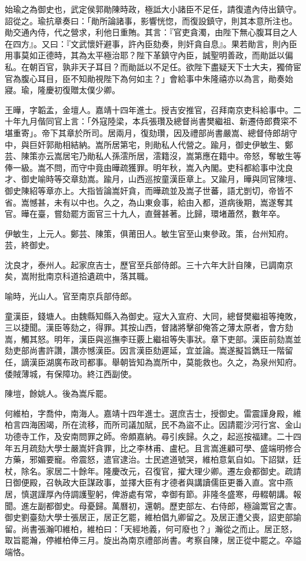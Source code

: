 \begin{pinyinscope}
始瑜之為御史也，武定侯郭勛陳時政，極詆大小諸臣不足任，請復遣內侍出鎮守。詔從之。瑜抗章奏曰：「勛所論諸事，影響恍惚，而復設鎮守，則其本意所注也。勛交通內侍，代之營求，利他日重賄。其言：『官吏貪濁，由陛下無心腹耳目之人在四方』。又曰：『文武懷奸避事，許內臣劾奏，則奸貪自息』。果若勛言，則內臣用事莫如正德時，其為太平極治耶？陛下革鎮守內臣，誠聖明善政，而勛詆以偏私。在朝百官，孰非天子耳目？而勛詆以不足任。欲陛下盡疑天下士大夫，獨倚宦官為腹心耳目，臣不知勛視陛下為何如主？」會給事中朱隆禧亦以為言，勛奏始寢。瑜，隆慶初復贈太僕少卿。

王曄，字韜孟，金壇人。嘉靖十四年進士。授吉安推官，召拜南京吏科給事中。二十年九月偕同官上言：「外寇陸梁，本兵張瓚及總督尚書樊繼祖、新遷侍郎費寀不堪重寄」。帝下其章於所司。居兩月，復劾瓚，因及禮部尚書嚴嵩、總督侍郎胡守中，與巨奸郭勛相結納。嵩所居第宅，則勛私人代營之。踰月，御史伊敏生、鄭芸、陳策亦云嵩居宅乃勛私人孫澐所居，澐籍沒，嵩第應在籍中。帝怒，奪敏生等俸一級。嵩不問，而守中竟由曄疏獲罪。明年秋，嵩入內閣。吏科都給事中沈良才、御史喻時等交章劾嵩。踰月，山西巡按童漢臣章上。又踰月，曄與同官陳塏、御史陳紹等章亦上。大指皆論嵩奸貪，而曄疏並及嵩子世蕃，語尤剴切，帝皆不省。嵩憾甚，未有以中也。久之，為山東僉事，給由入都，道病後期，嵩遂奪其官。曄在臺，嘗劾罷方面官三十九人，直聲甚著。比歸，環堵蕭然，數年卒。

伊敏生，上元人。鄭芸、陳策，俱莆田人。敏生官至山東參政。策，台州知府。芸，終御史。

沈良才，泰州人。起家庶吉士，歷官至兵部侍郎。三十六年大計自陳，已調南京矣，嵩附批南京科道拾遺疏中，落其職。

喻時，光山人。官至南京兵部侍郎。

童漢臣，錢塘人。由魏縣知縣入為御史。寇大入宣府、大同，總督樊繼祖等掩敗，三以捷聞。漢臣等劾之，得罪。其按山西，督諸將擊卻俺答之薄太原者，會方劾嵩，觸其怒。明年，漢臣與巡撫李玨覈上繼祖等失事狀。章下吏部。漢臣前劾嵩並劾吏部尚書許讚，讚亦憾漢臣。因言漢臣劾遲延，宜並論。嵩遂擬旨鐫玨一階留任，謫漢臣湖廣布政司都事。舉朝皆知為嵩所中，莫能救也。久之，為泉州知府。倭賊薄城，有保障功。終江西副使。

陳塏，餘姚人。後為嵩斥罷。

何維柏，字喬仲，南海人。嘉靖十四年進士。選庶吉士，授御史。雷震謹身殿，維柏言四海困竭，所在流移，而所司議加賦，民不為盜不止。因請罷沙河行宮、金山功德寺工作，及安南問罪之師。帝頗嘉納。尋引疾歸。久之，起巡按福建。二十四年五月疏劾大學士嚴嵩奸貪罪，比之李林甫、盧杞。且言嵩進顧可學、盛端明修合方藥，邪媚要寵。帝震怒，遣官逮治。士民遮道號哭，維柏意氣自如。下詔獄，廷杖，除名。家居二十餘年。隆慶改元，召復官，擢大理少卿。遷左僉都御史。疏請日御便殿，召執政大臣謀政事，並擇大臣有才德者與講讀儒臣更番入直。宮中燕居，慎選謹厚內侍調護聖躬，俾游處有常，幸御有節。非隆冬盛寒，毋輟朝講。報聞。進左副都御史。母憂歸。萬曆初，還朝。歷吏部左、右侍郎，極論鬻官之害。御史劉臺劾大學士張居正，居正乞罷，維柏倡九卿留之。及居正遭父喪，詔吏部諭留。尚書張瀚叩維柏，維柏曰：「天經地義，何可廢也？」瀚從之而止。居正怒，取旨罷瀚，停維柏俸三月。旋出為南京禮部尚書。考察自陳，居正從中罷之。卒謚端恪。


\end{pinyinscope}
